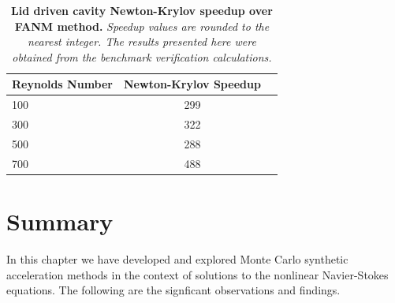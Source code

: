 \begin{table}[h!]
  \begin{center}
    \begin{tabular}{lcc}\hline\hline
      \multicolumn{1}{l}{Reynolds Number}& 
      \multicolumn{1}{c}{Newton-Krylov Speedup}\\
      \hline
      100 & 299 \\
      300 & 322 \\
      500 & 288 \\
      700 & 488 \\
      \hline\hline
    \end{tabular}
  \end{center}
  \caption{\textbf{Lid driven cavity Newton-Krylov speedup
      over FANM method.} \textit{Speedup values are rounded to the
      nearest integer. The results presented here were obtained from
      the benchmark verification calculations.}}
  \label{tab:driven_speedup_comparison}
\end{table}

\section{Summary}
\label{sec:nonlinear_summary}

In this chapter we have developed and explored Monte Carlo synthetic
acceleration methods in the context of solutions to the nonlinear
Navier-Stokes equations. The following are the signficant observations
and findings.

